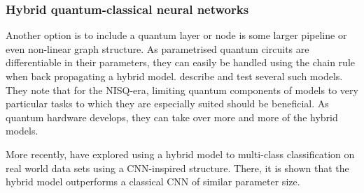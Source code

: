 \subsubsection{Hybrid quantum-classical neural networks}
Another option is to include a quantum layer or node is some larger pipeline or even non-linear graph structure.
As parametrised quantum circuits are differentiable in their parameters, they can easily be handled using the chain rule when back propagating a hybrid model.
\textcite{killoran2019} describe and test several such models.
They note that for the NISQ-era, limiting quantum components of models to very particular tasks to which they are especially suited should be beneficial.
As quantum hardware develops, they can take over more and more of the hybrid models.

More recently, \textcite{zeng2022} have explored using a hybrid model to multi-class classification on real world data sets using a CNN-inspired structure.
There, it is shown that the hybrid model outperforms a classical CNN of similar parameter size.